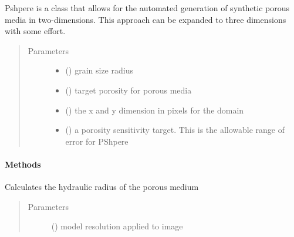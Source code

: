 \documentclass[letterpaper,10pt,english]{sphinxmanual}
\begin{document}
\begin{fulllineitems}
\label{\detokenize{index:lb_colloids.utilities.psphere.PSphere}}
Pshpere is a class that allows for the automated generation of
synthetic porous media in two-dimensions. This approach can be
expanded to three dimensions with some effort.
\begin{quote}\begin{description}
\item[{Parameters}] \leavevmode\begin{itemize}
\item {} 
 () \textendash{} grain size radius

\item {} 
 () \textendash{} target porosity for porous media

\item {} 
 () \textendash{} the x and y dimension in pixels for the domain

\item {} 
 () \textendash{} a porosity sensitivity target. This is the allowable range of error for PShpere

\end{itemize}

\end{description}\end{quote}
\paragraph{Methods}

\begin{fulllineitems}
\label{\detokenize{index:lb_colloids.utilities.psphere.PSphere.calculate_hydraulic_radius}}
Calculates the hydraulic radius of the porous medium
\begin{quote}\begin{description}
\item[{Parameters}] \leavevmode
{} () \textendash{} model resolution applied to image


\end{description}
\end{quote}
\end{fulllineitems}
\end{fulllineitems}
\end{document}
